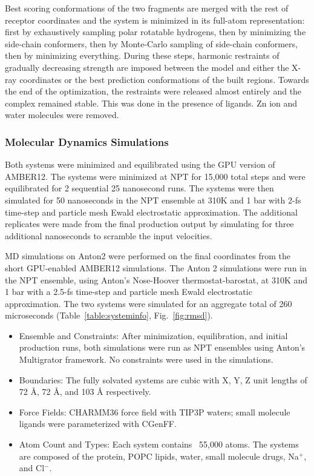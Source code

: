 Best scoring conformations of the two fragments are merged with the rest of receptor coordinates and the system is minimized in its full-atom representation: first by exhaustively sampling polar rotatable hydrogens, then by minimizing the side-chain conformers, then by Monte-Carlo sampling of side-chain conformers, then by minimizing everything. During these steps, harmonic restraints of gradually decreasing strength are imposed between the model and either the X-ray coordinates or the best prediction conformations of the built regions. Towards the end of the optimization, the restraints were released almost entirely and the complex remained stable. This was done in the presence of ligands. Zn ion and water molecules were removed.

\subsubsection{Molecular Dynamics Simulations} Both systems were minimized and equilibrated using the GPU version of AMBER12. The systems were minimized at NPT for 15,000 total steps and were equilibrated for 2 sequential 25 nanosecond runs. The systems were then simulated for 50 nanoseconds in the NPT ensemble at 310K and 1 bar with 2-fs time-step and particle mesh Ewald electrostatic approximation. The additional replicates were made from the final production output by simulating for three additional nanoseconds to scramble the input velocities.

MD simulations on Anton2 were performed on the final coordinates from the short GPU-enabled AMBER12 simulations. The Anton 2 simulations were run in the NPT ensemble, using Anton's Nose-Hoover thermostat-barostat, at 310K and 1 bar with a 2.5-fs time-step and particle mesh Ewald electrostatic approximation. The two systems were simulated for an aggregate total of 260 microseconds (Table~\ref{table:systeminfo}, Fig.~\ref{fig:rmsd}).

\begin{itemize}
  \item Ensemble and Constraints: After minimization, equilibration, and initial production runs, both simulations were run as NPT ensembles using Anton's Multigrator framework. No constraints were used in the simulations.
  \item Boundaries: The fully solvated systems are cubic with X, Y, Z unit lengths of 72 \si{\angstrom}, 72 \si{\angstrom}, and 103 \si{\angstrom} respectively.
  \item Force Fields: CHARMM36 force field with TIP3P waters; small molecule ligands were parameterized with CGenFF.
  \item Atom Count and Types: Each system contains ~55,000 atoms. The systems are composed of the protein, POPC lipids, water, small molecule drugs, Na$^+$, and Cl$^-$.
\end{itemize}

